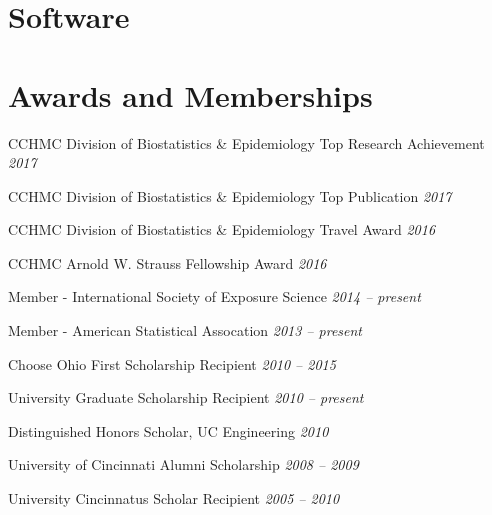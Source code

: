 \documentclass[margin,line]{res}
\newenvironment{list3}{
  \begin{list}{}{%
      \setlength{\itemsep}{0in}
      \setlength{\parsep}{0in} \setlength{\parskip}{0in}
      \setlength{\topsep}{0in} \setlength{\partopsep}{0in}
      \setlength{\leftmargin}{0in}}}{\end{list}}
\begin{document}
\begin{resume}
\section{\sc Software}


\section{\sc Awards and Memberships}

\begin{list3} \itemsep 4pt
\item[] CCHMC Division of Biostatistics \& Epidemiology Top Research Achievement \hfill \textit{2017}
\item[] CCHMC Division of Biostatistics \& Epidemiology Top Publication \hfill \textit{2017}
\item[] CCHMC Division of Biostatistics \& Epidemiology Travel Award \hfill \textit{2016}
\item[] CCHMC Arnold W. Strauss Fellowship Award \hfill \textit{2016}
\item[] Member - International Society of Exposure Science \hfill \textit{2014 -- present}
\item[] Member - American Statistical Assocation \hfill \textit{2013 -- present}
\item[] Choose Ohio First Scholarship Recipient \hfill \textit{2010 -- 2015}
\item[] University Graduate Scholarship Recipient \hfill \textit{2010 -- present}
\item[] Distinguished Honors Scholar, UC Engineering \hfill \textit{2010}
\item[] University of Cincinnati Alumni Scholarship \hfill \textit{2008 -- 2009}
\item[] University Cincinnatus Scholar Recipient \hfill \textit{2005 -- 2010}
\end{list3}



\end{resume}
\end{document}
